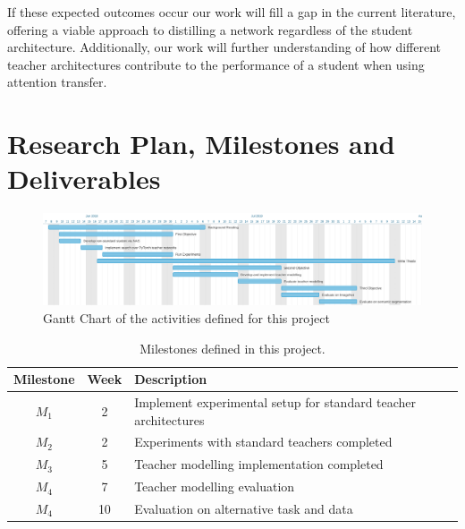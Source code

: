 \documentclass[a4paper,11pt]{article}
\begin{document}
If these expected outcomes occur our work will fill a gap in the current literature, offering a viable approach to distilling a network regardless of the student architecture. Additionally, our work will further understanding of how different teacher architectures contribute to the performance of a student when using attention transfer.




\section{Research Plan, Milestones and Deliverables}
\label{sec:plan}
\begin{figure}[h!]
  \caption{Gantt Chart of the activities defined for this project}
  \centering
  \includegraphics[scale=0.45]{Gantt.pdf}
\end{figure}

\begin{table}[htbp]
    \begin{center}
        \begin{tabular}{|c|c|l|}
        \hline
        \textbf{Milestone} & \textbf{Week} & \textbf{Description} \\
        \hline
        $M_1$ & 2 & Implement experimental setup for standard teacher architectures\\
        $M_2$ & 2 & Experiments with standard teachers completed\\
        $M_3$ & 5 & Teacher modelling implementation completed \\
        $M_4$ & 7 & Teacher modelling evaluation \\
        $M_4$ & 10 & Evaluation on alternative task and data\\
        \hline
        \end{tabular} 
    \end{center}
    \caption{Milestones defined in this project.}
    \label{fig:milestones}
\end{table}
\end{document}
